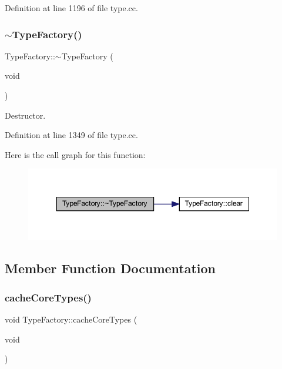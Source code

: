 Definition at line 1196 of file type.\+cc.

\mbox{\label{class_type_factory_a2d006876061f78e680f8697a335399d5}} 
\subsubsection{\texorpdfstring{$\sim$TypeFactory()}{~TypeFactory()}}
{\footnotesize\ttfamily Type\+Factory\+::$\sim$\+Type\+Factory (\begin{DoxyParamCaption}\item[{void}]{ }\end{DoxyParamCaption})\hspace{0.3cm}{\ttfamily [virtual]}}



Destructor. 



Definition at line 1349 of file type.\+cc.

Here is the call graph for this function\+:
\nopagebreak
\begin{figure}[H]
\begin{center}
\leavevmode
\includegraphics[width=350pt]{class_type_factory_a2d006876061f78e680f8697a335399d5_cgraph}
\end{center}
\end{figure}


\subsection{Member Function Documentation}
\mbox{\label{class_type_factory_a16ccfeecd29c1d5d40ada6b1d4032212}} 
\subsubsection{\texorpdfstring{cacheCoreTypes()}{cacheCoreTypes()}}
{\footnotesize\ttfamily void Type\+Factory\+::cache\+Core\+Types (\begin{DoxyParamCaption}\item[{void}]{ }\end{DoxyParamCaption})}



